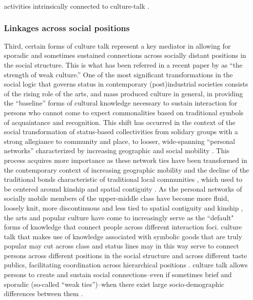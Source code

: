 activities intrinsically connected to culture-talk \citep[797]{kadushin66}.

\subsubsection{Linkages across social positions}
\label{subsubsec:linkages}
Third, certain forms of culture talk represent a key mediator in allowing for sporadic and sometimes sustained connections across socially distant positions in the social structure.  This is what has been referred in a recent paper by \citet{schultz_breiger10} as ``the strength of weak culture.''  One of the most significant transformations in the social logic that governs status in contemporary (post)industrial societies consists of the rising role of the arts, and mass produced culture in general, in providing the ``baseline'' forms of cultural knowledge necessary to sustain interaction for persons who cannot come to expect commonalities based on traditional symbols of acquaintance and recognition. This shift has occurred in the context of the social transformation of status-based collectivities from solidary groups with a strong allegiance to community and place, to looser, wide-spanning ``personal networks'' characterized by increasing geographic and social mobility \citep{wellman_etal88}.  This process acquires more importance as these network ties have been transformed in the contemporary context of increasing geographic mobility \citep{griswold_wright04} and the decline of the traditional bonds characteristic of traditional local communities \citep{wellman79}, which used to be centered around kinship and spatial contiguity \citep{dimaggio_mohr85}.  As the personal networks of socially mobile members of the upper-middle class have become more fluid, loosely knit, more discontinuous and less tied to spatial contiguity and kinship \citep{wellman_wortley90, wellman_etal88}, the arts and popular culture have come to increasingly serve as the ``default" forms of knowledge that connect people across different interaction foci.  culture talk that makes use of knowledge associated with symbolic goods that are truly popular may cut across class and status lines may in this way serve to connect persons across different positions in the social structure and across different taste publics, facilitating coordination across hierarchical positions \citep{erickson96}.   culture talk allows persons to create and sustain social connections--even if sometimes brief and sporadic (so-called ``weak ties'')--when there exist large socio-demographic differences between them \citep{lizardo06a}.

